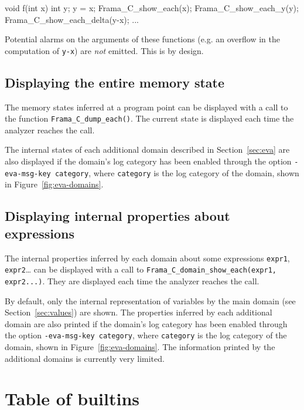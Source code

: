 \documentclass{frama-c-book}
\begin{document}
\begin{listing-nonumber}
void f(int x)
{
  int y;
  y = x;
  Frama_C_show_each(x);
  Frama_C_show_each_y(y);
  Frama_C_show_each_delta(y-x);
  ...
}
\end{listing-nonumber}

Potential alarms on the arguments of these functions (e.g. an overflow
in the computation of \lstinline|y-x|) are \emph{not} emitted. This is
by design.

\subsection{Displaying the entire memory state}

The memory states inferred at a program point can be displayed with a call to
the function \lstinline|Frama_C_dump_each()|. The current state is displayed
each time the analyzer reaches the call.

The internal states of each additional domain described in Section~\ref{sec:eva}
are also displayed if the domain's log category has been enabled through the
option \verb+-eva-msg-key category+, where \verb+category+ is the log category
of the domain, shown in Figure~\ref{fig:eva-domains}.

\subsection{Displaying internal properties about expressions}

The internal properties inferred by each domain about some expressions
\lstinline|expr1|, \lstinline|expr2|… can be displayed with a call to
\lstinline|Frama_C_domain_show_each(expr1, expr2...)|. They are displayed each
time the analyzer reaches the call.

By default, only the internal representation of variables by the main domain
(see Section~\ref{sec:values}) are shown. The properties inferred by each
additional domain are also printed if the domain's log category has been enabled
through the option \verb+-eva-msg-key category+, where \verb+category+ is the
log category of the domain, shown in Figure~\ref{fig:eva-domains}. The
information printed by the additional domains is currently very limited.


\section{Table of builtins}
\label{builtins-list}
\end{document}
